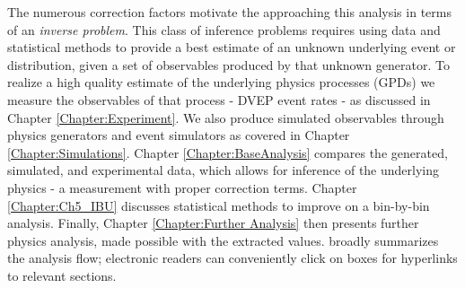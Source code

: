         The numerous correction factors motivate the approaching this analysis in terms of an \textit{inverse problem}. This class of inference problems requires using data and statistical methods to provide a best estimate of an unknown underlying event or distribution, given a set of observables produced by that unknown generator. To realize a high quality estimate of the underlying physics processes (GPDs) we measure the observables of that process - DVEP event rates - as discussed in Chapter \ref{Chapter:Experiment}. We also produce simulated observables through physics generators and event simulators as covered in Chapter \ref{Chapter:Simulations}. Chapter \ref{Chapter:BaseAnalysis} compares the generated, simulated, and experimental data, which allows for inference of the underlying physics - a \xsec measurement with proper correction terms. Chapter \ref{Chapter:Ch5_IBU} discusses statistical methods to improve on a bin-by-bin analysis. Finally, Chapter \ref{Chapter:Further Analysis} then presents further physics analysis, made possible with the extracted \xsec values.  broadly summarizes the analysis flow; electronic readers can conveniently click on boxes for hyperlinks to relevant sections. 



